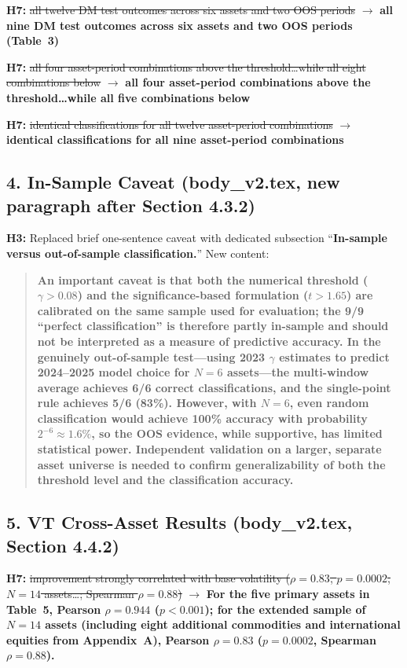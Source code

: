 \documentclass[12pt,a4paper]{article}
\newcommand{\old}[1]{\textcolor{oldred}{\st{#1}}}
\newcommand{\new}[1]{\textcolor{newgreen}{\textbf{#1}}}
\begin{document}
\textbf{H7:} \old{all twelve DM test outcomes across six assets and two OOS periods} $\to$ \new{all nine DM test outcomes across six assets and two OOS periods (Table~3)}

\textbf{H7:} \old{all four asset-period combinations above the threshold\ldots while all eight combinations below} $\to$ \new{all four asset-period combinations above the threshold\ldots while all five combinations below}

\textbf{H7:} \old{identical classifications for all twelve asset-period combinations} $\to$ \new{identical classifications for all nine asset-period combinations}

\subsection*{4. In-Sample Caveat (body\_v2.tex, new paragraph after Section 4.3.2)}

\textbf{H3:} Replaced brief one-sentence caveat with dedicated subsection ``\textbf{In-sample versus out-of-sample classification.}'' New content:

\begin{quote}
\new{An important caveat is that both the numerical threshold ($\gamma > 0.08$) and the significance-based formulation ($t > 1.65$) are calibrated on the same sample used for evaluation; the 9/9 ``perfect classification'' is therefore partly in-sample and should not be interpreted as a measure of predictive accuracy. In the genuinely out-of-sample test---using 2023 $\gamma$ estimates to predict 2024--2025 model choice for $N = 6$ assets---the multi-window average achieves 6/6 correct classifications, and the single-point rule achieves 5/6 (83\%). However, with $N = 6$, even random classification would achieve 100\% accuracy with probability $2^{-6} \approx 1.6\%$, so the OOS evidence, while supportive, has limited statistical power. Independent validation on a larger, separate asset universe is needed to confirm generalizability of both the threshold level and the classification accuracy.}
\end{quote}

\subsection*{5. VT Cross-Asset Results (body\_v2.tex, Section 4.4.2)}

\textbf{H7:} \old{improvement strongly correlated with base volatility ($\rho = 0.83$, $p = 0.0002$, $N = 14$ assets\ldots; Spearman $\rho = 0.88$)} $\to$ \new{For the five primary assets in Table~5, Pearson $\rho = 0.944$ ($p < 0.001$); for the extended sample of $N = 14$ assets (including eight additional commodities and international equities from Appendix~A), Pearson $\rho = 0.83$ ($p = 0.0002$, Spearman $\rho = 0.88$).}
\end{document}
